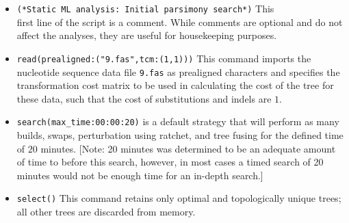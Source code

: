 \begin{itemize}

\item \texttt{(*Static ML analysis: Initial parsimony search*)} This \\ first line of the 
script is a comment. While comments are optional and do not affect the analyses, they are useful for 
housekeeping purposes.
\item \texttt{read(prealigned:("9.fas",tcm:(1,1)))} This command imports the nucleotide sequence data file \texttt{9.fas} 
as prealigned characters and specifies the transformation cost matrix to be used in calculating the cost of the tree
for these data, such that the cost of substitutions and indels are $1$.
\item \texttt{search(max\_time:00:00:20)}  is a default strategy that will perform as many builds, 
swaps,  perturbation using ratchet, and tree fusing for the defined time of $ 20 $ minutes. [Note: 20 minutes was 
determined to be an adequate amount of time to before this search, however, in most cases a timed search of 20 minutes 
would not be enough time for an in-depth search.]
\item \texttt{select()} This command retains only optimal and topologically unique trees; all other trees are discarded 
from memory.  


\end{itemize}
